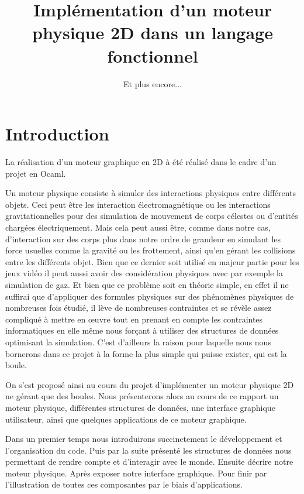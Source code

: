 \documentclass[a4paper]{scrartcl}
\title{Implémentation d'un moteur physique 2D dans un langage fonctionnel}
\subtitle{Et plus encore...}
\begin{document}
\maketitle

\tableofcontents

\newpage

\section*{Introduction}
La réalisation d'un moteur graphique en 2D à été réalisé dans le cadre d'un projet en Ocaml.

Un moteur physique consiste à simuler des interactions physiques entre différents objets. Ceci peut être les interaction électromagnétique ou les interactions gravitationnelles pour des simulation de mouvement de corps célestes ou d'entités chargées électriquement. Mais cela peut aussi être, comme dans notre cas, d'interaction sur des corps plus dans notre ordre de grandeur en simulant les force usuelles comme la gravité ou les frottement, ainsi qu'en gérant les collisions entre les différents objet. Bien que ce dernier soit utilisé en majeur partie pour les jeux vidéo il peut aussi avoir des considération physiques avec par exemple la simulation de gaz. Et bien que ce problème soit en théorie simple, en effet il ne suffirai que d'appliquer des formules physiques sur des phénomènes physiques de nombreuses fois étudié, il lève de nombreuses contraintes et se révèle assez compliqué à mettre en œuvre tout en prenant en compte les contraintes informatiques en elle même nous forçant à utiliser des structures de données optimisant la simulation. C'est d'ailleurs la raison pour laquelle nous nous bornerons dans ce projet à la forme la plus simple qui puisse exister, qui est la boule.

On s'est proposé ainsi au cours du projet d'implémenter un moteur physique 2D ne gérant que des boules. Nous présenterons alors au cours de ce rapport un moteur physique, différentes structures de données, une interface graphique utilisateur, ainsi que quelques applications de ce moteur graphique.

Dans un premier temps nous introduirons succinctement  le développement et l'organisation du code. Puis par la suite présenté les structures de données nous permettant de rendre compte et d'interagir avec le monde. Ensuite décrire notre moteur physique. Après exposer notre interface graphique. Pour finir par l'illustration de toutes ces composantes par le biais d'applications.
\end{document}
